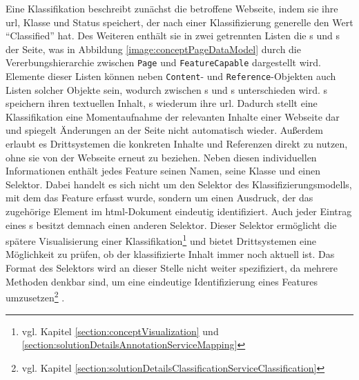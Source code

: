         Eine Klassifikation beschreibt zunächst die betroffene Webseite,
        indem sie ihre \gls{url}, Klasse und Status speichert,
        der nach einer Klassifizierung generelle den Wert "`Classified"' hat.       
        Des Weiteren enthält sie in zwei getrennten Listen die {\contentFeature}s
        und {}s der Seite, was in Abbildung \ref{image:conceptPageDataModel}
        durch die Vererbungshierarchie zwischen \texttt{Page} und \texttt{FeatureCapable}
        dargestellt wird.
        Elemente dieser Listen können neben \texttt{Content}- und \texttt{Reference}-Objekten
        auch Listen solcher Objekte sein,
        wodurch zwischen {\scalarFeature}s und {\collectionFeature}s unterschieden wird.
        {\contentFeature}s speichern ihren textuellen Inhalt,
        {}s wiederum ihre \gls{url}.
        Dadurch stellt eine Klassifikation eine Momentaufnahme der relevanten Inhalte
        einer Webseite dar und spiegelt Änderungen an der Seite nicht
        automatisch wieder.
        Außerdem erlaubt es Drittsystemen die konkreten Inhalte und Referenzen
        direkt zu nutzen, ohne sie von der Webseite erneut zu beziehen.
        Neben diesen individuellen Informationen enthält jedes Feature
        seinen Namen, seine Klasse und einen Selektor.
        Dabei handelt es sich nicht um den Selektor des Klassifizierungsmodells,
        mit dem das Feature erfasst wurde,
        sondern um einen Ausdruck, der das zugehörige Element im \gls{html}-Dokument eindeutig identifiziert.
        Auch jeder Eintrag eines {\collectionFeature}s besitzt demnach einen anderen Selektor.
        Dieser Selektor ermöglicht die spätere Visualisierung einer
        Klassifikation\footnote{vgl. Kapitel \ref{section:conceptVisualization} und
        \ref{section:solutionDetailsAnnotationServiceMapping}}
        und bietet Drittsystemen eine Möglichkeit zu prüfen,
        ob der klassifizierte Inhalt immer noch aktuell ist.
        Das Format des Selektors wird an dieser Stelle nicht weiter spezifiziert,
        da mehrere Methoden denkbar sind, um eine eindeutige Identifizierung eines Features
        umzusetzen\footnote{vgl. Kapitel \ref{section:solutionDetailsClassificationServiceClassification}} .
